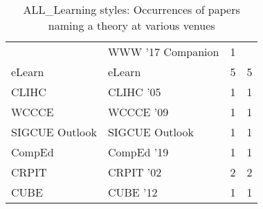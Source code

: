\begin{table*}[t]
\begin{tabular}{llrr}
& WWW '17 Companion & 1 &\\
\multirow{1}{*}{eLearn} & eLearn & 5 & \multirow{1}{*}{5}\\
\multirow{1}{*}{CLIHC } & CLIHC '05 & 1 & \multirow{1}{*}{1}\\
\multirow{1}{*}{WCCCE } & WCCCE '09 & 1 & \multirow{1}{*}{1}\\
\multirow{1}{*}{SIGCUE Outlook} & SIGCUE Outlook & 1 & \multirow{1}{*}{1}\\
\multirow{1}{*}{CompEd } & CompEd '19 & 1 & \multirow{1}{*}{1}\\
\multirow{1}{*}{CRPIT } & CRPIT '02 & 2 & \multirow{1}{*}{2}\\
\multirow{1}{*}{CUBE } & CUBE '12 & 1 & \multirow{1}{*}{1}\\
\end{tabular}
\caption{ALL\_Learning styles: Occurrences of papers naming a theory at various venues}
\end{table*}